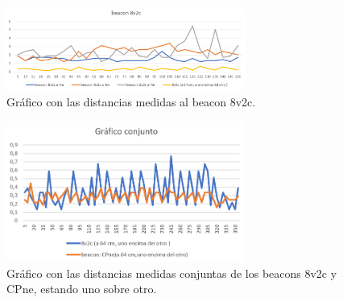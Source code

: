 \begin{figure}[t]
	\centering
	\includegraphics[width=0.7\textwidth]{Imagenes/Descripciondeltrabajo/dist_8v2c}
	\caption{Gráfico con las distancias medidas al beacon 8v2c. }
	\label{fig:dist_8v2c}
\end{figure}

\begin{figure}[t]
	\centering
	\includegraphics[width=0.7\textwidth]{Imagenes/Descripciondeltrabajo/dist_conjunto}
	\caption{Gráfico con las distancias medidas conjuntas de los beacons 8v2c y CPne, estando uno sobre otro. }
	\label{fig:dist_conjunto}
\end{figure}
